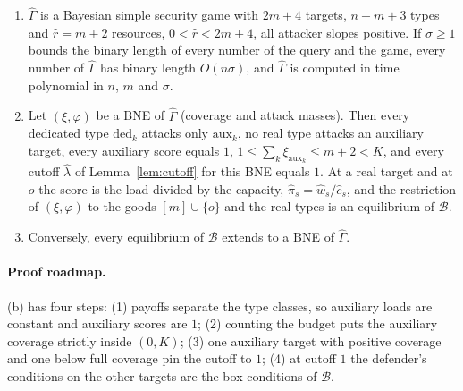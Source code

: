 \begin{lemma}\label{lem:sxm-game}
\begin{enumerate}[nosep,label=(\alph*)]
\item $\widehat\Gamma$ is a Bayesian simple security game with $2m+4$ targets, $n+m+3$ types and
$\hat r=m+2$ resources, $0<\hat r<2m+4$, all attacker slopes positive. If $\sigma\ge1$ bounds the
binary length of every number of the query and the game, every number of $\widehat\Gamma$ has binary
length $O(n\sigma)$, and $\widehat\Gamma$ is computed in time polynomial in $n$, $m$ and $\sigma$.
\item Let $(\xi,\varphi)$ be a BNE of $\widehat\Gamma$ (coverage and attack masses). Then every dedicated
type $\mathrm{ded}_k$ attacks only $\mathrm{aux}_k$, no real type attacks an auxiliary target, every
auxiliary score equals $1$, $1\le\sum_k\xi_{\mathrm{aux}_k}\le m+2<K$, and every cutoff $\hat\lambda$ of
Lemma~\ref{lem:cutoff} for this BNE equals $1$. At a real target and at $o$ the score is the load divided
by the capacity, $\hat\pi_s=\hat w_s/\hat c_s$, and the restriction of $(\xi,\varphi)$ to the goods
$[m]\cup\{o\}$ and the real types is an equilibrium of $\mathcal B$.
\item Conversely, every equilibrium of $\mathcal B$ extends to a BNE of $\widehat\Gamma$.
\end{enumerate}
\end{lemma}

\paragraph{Proof roadmap.} (b) has four steps: (1) payoffs separate the type classes, so auxiliary loads
are constant and auxiliary scores are $1$; (2) counting the budget puts the auxiliary coverage strictly
inside $(0,K)$; (3) one auxiliary target with positive coverage and one below full coverage pin the
cutoff to $1$; (4) at cutoff $1$ the defender's conditions on the other targets are the box conditions
of $\mathcal B$.

